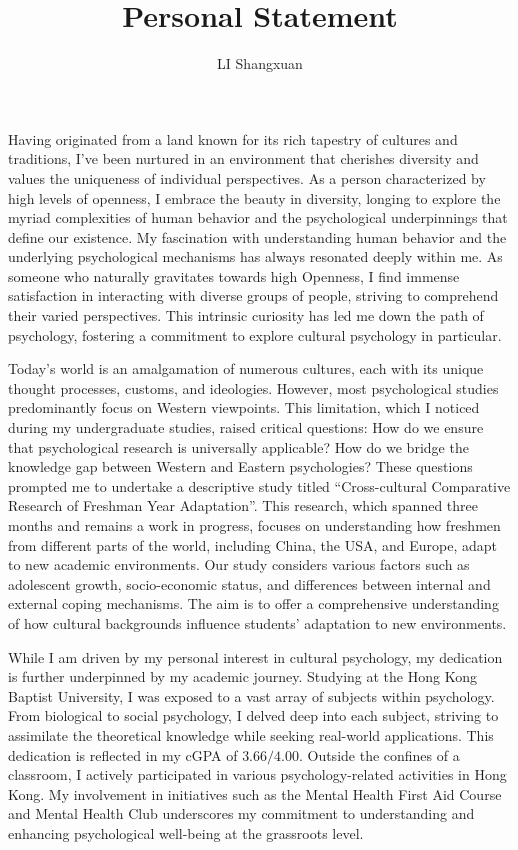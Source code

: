 \documentclass[]{article}
\title{Personal Statement}
\author{LI Shangxuan}
\begin{document}
\maketitle

Having originated from a land known for its rich tapestry of cultures and traditions, I've been nurtured in an environment that cherishes diversity and values the uniqueness of individual perspectives.
As a person characterized by high levels of openness, I embrace the beauty in diversity, longing to explore the myriad complexities of human behavior and the psychological underpinnings that define our existence.
My fascination with understanding human behavior and the underlying psychological mechanisms has always resonated deeply within me.
As someone who naturally gravitates towards high Openness, I find immense satisfaction in interacting with diverse groups of people, striving to comprehend their varied perspectives.
This intrinsic curiosity has led me down the path of psychology, fostering a commitment to explore cultural psychology in particular.

Today's world is an amalgamation of numerous cultures, each with its unique thought processes, customs, and ideologies.
However, most psychological studies predominantly focus on Western viewpoints.
This limitation, which I noticed during my undergraduate studies, raised critical questions: How do we ensure that psychological research is universally applicable? How do we bridge the knowledge gap between Western and Eastern psychologies? These questions prompted me to undertake a descriptive study titled ``Cross-cultural Comparative Research of Freshman Year Adaptation''.
This research, which spanned three months and remains a work in progress, focuses on understanding how freshmen from different parts of the world, including China, the USA, and Europe, adapt to new academic environments.
Our study considers various factors such as adolescent growth, socio-economic status, and differences between internal and external coping mechanisms.
The aim is to offer a comprehensive understanding of how cultural backgrounds influence students' adaptation to new environments.

While I am driven by my personal interest in cultural psychology, my dedication is further underpinned by my academic journey.
Studying at the Hong Kong Baptist University, I was exposed to a vast array of subjects within psychology.
From biological to social psychology, I delved deep into each subject, striving to assimilate the theoretical knowledge while seeking real-world applications.
This dedication is reflected in my cGPA of $3.66/4.00$.
Outside the confines of a classroom, I actively participated in various psychology-related activities in Hong Kong.
My involvement in initiatives such as the Mental Health First Aid Course and Mental Health Club underscores my commitment to understanding and enhancing psychological well-being at the grassroots level.
\end{document}
